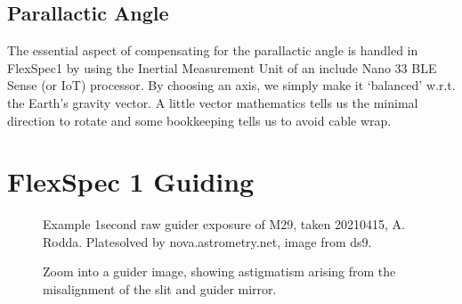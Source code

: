 \documentclass[letterpaper,10pt,english,openany,oneside]{sphinxmanual}
\begin{document}
\section{Parallactic Angle}
\label{\detokenize{mathematics:parallactic-angle}}
\sphinxAtStartPar
The essential aspect of compensating for the parallactic angle is
handled in FlexSpec1 by using the Inertial Measurement Unit of an
include Nano 33 BLE Sense (or IoT) processor. By choosing an axis,
we simply make it ‘balanced’ w.r.t. the Earth’s gravity vector.
A little vector mathematics tells us the minimal direction to rotate
and some book\sphinxhyphen{}keeping tells us to avoid cable wrap.


\chapter{FlexSpec 1 Guiding}
\label{\detokenize{guiding:flexspec-1-guiding}}\label{\detokenize{guiding::doc}}
\begin{figure}[htbp]
\centering
\capstart

\noindent{}
\caption{Example 1\sphinxhyphen{}second raw guider exposure of M29, taken 2021\sphinxhyphen{}04\sphinxhyphen{}15, A. Rodda. Platesolved by nova.astrometry.net, image from ds9.}\label{\detokenize{guiding:id1}}\label{\detokenize{guiding:rawguide1}}\end{figure}

\begin{figure}[htbp]
\centering
\capstart

\noindent{}
\caption{Zoom into a guider image, showing astigmatism arising from the misalignment of the slit and guider mirror.}\label{\detokenize{guiding:id2}}\end{figure}
\end{document}
